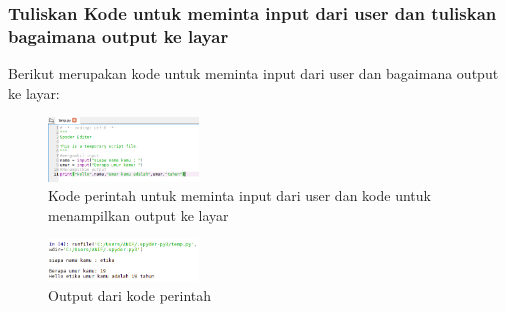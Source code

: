 \subsubsection{Tuliskan Kode untuk meminta input dari user dan tuliskan bagaimana output ke layar}
Berikut merupakan kode untuk meminta input dari user dan bagaimana output ke layar:
\begin{figure}[H]
		\includegraphics[width=4cm]{figures/1184065/KodeInputOutput1.PNG}
		\centering
		\caption{Kode perintah untuk meminta input dari user dan kode untuk menampilkan output ke layar}
\end{figure}
\begin{figure}[H]
		\includegraphics[width=4cm]{figures/1184065/KodeHasilInputOutput2.PNG}
		\centering
		\caption{Output dari kode perintah  }
\end{figure}
\hfill \break
